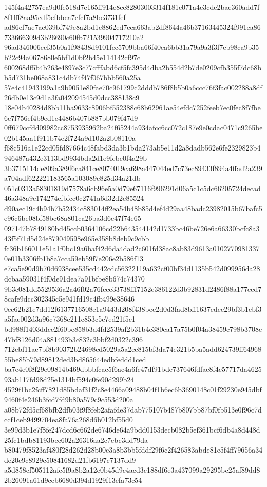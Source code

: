 \documentclass[11pt,a4paper]{article}
\begin{document}
{145f4a42757ea9d0fe518d7e165ff914e8ce82803003314f181c071a4c3cde2bae360add7f8f1fff8aa95cdf5efbbca7efcf7a8be3731fef
ad86ef7ae7ae039bf749e8a2bd1e8862ed7eea663ab2df8644a46b37163445324f991ea86733666309d3b26690c60fb721539904717210a2
96ad346006ecf35b0a1f98438d9101fec5709bba66f40ea6bb31a79a9a3f3f7eb98ca9b35b22c94a0678680e5bf1d0bf2b45e114142cf97c
600268df5b4b263e4897e3c77cfffabd6cf5fc395d4dba2b554d2b7de0209cfb355f7dc68bb5d731be068a831c4db74f47f067bbb560a25a
57e4c41943199a1a9b9051e80fae70c961799c2dddb786f8b5b0a6ccc76f3fac002288a8df26db0e13c9d1a3fa042094545d0dcc388138c9
18e04b40284d8bb11ba9633c8906bf552388c68b62961ae54efdc7252feeb7ec0fec8f7fbe6c7f756ef4b9ed1e4486b407b887bb079f47d9
0ff679ccfdd09982cc8753935962ba24f65244a934afcc6cc072c187e9e0cdac0471c9265be02b145aa1f911b74e2f724a9d102a2b08110a
f68c516a1e22cd05fd87664c48fabd3da3b1bda273ab5e11d2a8dadb562e6fe2329823b4946487a432e3113bd9934bda2d1e9fcbe0f4a29b
3b3715114de809a389f6ca841ce8074019ca698a447044ed7c73ec89433f894a4ffad2a239a704adf622221183565a103089c825d34a21db
051c0313a58301819d7578a6cb96e5a0d79e67116f996291d06a5c1c5dc66205724decad46a348a9c174274cfbfcc0c2741a6d32d2e85524
d90aec19c4b94b7b52434c883014ff2ea54b48b85d4ef4d29aa48badc23982015b67bafc5e96c6be08bf58bc68a801ca26ba3d6e47f74e65
097147b7849180bd45ccb0364106cd22b643544142d1733bc46be726e6a66330bcfc8a343f5f71d5d24e879049598e965e358b8deb9c9cbb
fc36b166011e51a1f0bc19a6baf42d6da4dad2c601fd38ac8ab83d9613a01027709813370e01b3306fb1b8a7cca59eb59f7e206e2b586f13
e7ca5e90d9b70d6938cee535cd442cdc56322119a632cf00bf34d1135b542d099956da28dcbaa59031f4f0de91dea7a91bfbe8b674c74370
9b3c081dd5529536a2a46f02a76fece33738fff7152c386122d3b92831d2486f88a177eed78cafe9dcc302345c5e941fd19c4fb499e38646
0ec62b21e7dd12f6137716508e1a9443d208f438bec2d0d3fad8bff1637edee29bf3b1ebf3a5fae002d3a96c7368e211c853c5c7ed21f5c1
bd988f1403ddce2f60be858b3d4fd2539af2b31b4c380ea17a75b0f04a38459c798b3708e47bf8126d04a881493b3c832c3bbf2d0322c396
712cbf11ae7bf8b90372b24698cd5029a5a2ec815bf3da74e321b5ba5add624739ff6496855be85b79d89812ded3bd865644edbfeddd1ced
ba7e4e0f8f29e09814b469dbbbfcac5f6ac4a6fc47df91bde737646fdfae8f4c57717da462593ab117fd98d25e1314bf594c0fe90d299b24
4529f1bc2fcff7821d85bdaf31f2c8e4466a09488b04f1b6ec6b3690148c01f29230e945dbf9460f4e246b3fcd7fd9b80a579c9c553d200a
a08b72fd5cf68bfb2dfb03f9f8feb2afafde37dab775107b487b807bb87bf0fb513e0f96c7dccf1ceb9499704ea8fa76a268d6b012bf55d0
3e99d3b1e7f8fe247dcd6c662de6746de64a9bdd0153decb082b5ef361bcf6db4a8d448d25fc1bdb81193bec602a26316aa2c7ebc3dd79da
b80479f8523af480f28d262d28b00c3a8b3bb5fddf29f6c2f426583abde81e5f4ff79656a34de20c9c8929c50841682d21fb6197c7137dd9
a5d858cf505112afe5f9a8b2a12e0b45d9c4acd3c188df6e3a437099a29295bc25af89dd82b26091a61d9ceb6680d394d1929f13efa73c54
}
\end{document}
